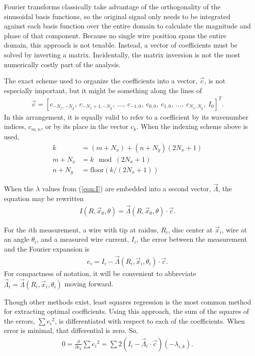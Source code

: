 \documentclass{article}
\def\x{\vec{x}}
\begin{document}
Fourier transforms classically take advantage of the orthogonality of the sinusoidal basis functions, so the original signal only needs to be integrated against each basis function over the entire domain to calculate the magnitude and phase of that component.  Because no single wire position spans the entire domain, this approach is not tenable.  Instead, a vector of coefficients must be solved by inverting a matrix.  Incidentally, the matrix inversion is not the most numerically costly part of the analysis.

The exact scheme used to organize the coefficients into a vector, $\vec{c}$, is not especially important, but it might be something along the lines of 
\begin{align}
\vec{c} = [c_{-N_x,-N_y},\ c_{-N_x+1, -N_y},\ \ldots,\ c_{-1,0},\ c_{0,0},\ c_{1,0},\ \ldots,\ c_{N_x,N_y},\ I_0]^T.
\end{align}
In this arrangement, it is equally valid to refer to a coefficient by its wavenumber indices, $c_{m,n}$, or by its place in the vector $c_k$.  When the indexing scheme above is used,
\begin{align}
k &= (m + N_x) + (n+N_y) (2N_x+1)\\
m + N_x &= k \mod{(2N_x+1)}\\
n + N_y &= \mathrm{floor}(k / (2N_x+1))
\end{align}

When the $\lambda$ values from (\ref{eqn:I}) are embedded into a second vector, $\vec{\Lambda}$, the equation may be rewritten
\begin{align}
I(R,\x_0,\theta) = \vec{\Lambda}(R,\x_0,\theta) \cdot \vec{c}.
\end{align}

For the $i$th measurement, a wire with tip at raidus, $R_i$, disc center at $\x_i$, wire at an angle $\theta_i$, and a measured wire current, $I_i$, the error between the measurement and the Fourier expansion is
\begin{align}
e_i = I_i - \vec{\Lambda}(R_i, \x_i, \theta_i) \cdot \vec{c}.
\end{align}
For compactness of notation, it will be convenient to abbreviate $\vec{\Lambda}_i = \vec{\Lambda}(R_i, \x_i, \theta_i)$ moving forward.  

Though other methods exist, least squares regression is the most common method for extracting optimal coefficients.  Using this approach, the sum of the squares of the errors, $\sum e_i{^2}$, is differentiated with respect to each of the coefficients.  When error is minimal, that differential is zero.  So,
\begin{align}
0 = \frac{\partial}{\partial c_k} \sum e_i {^2} = \sum 2\left(I_i - \vec{\Lambda}_i \cdot \vec{c}\right)\left(- \lambda_{i,k}\right).
\end{align}
\end{document}
